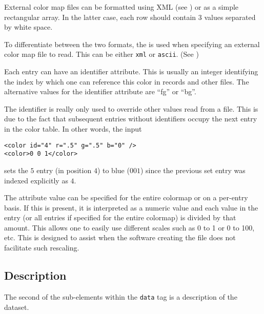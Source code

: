 \documentclass{article}
\def\XMLAttribute#1{\Escape{#1}}
\begin{document}


External color map files can be formatted using XML (see
) or as a simple rectangular array.  In the
latter case, each row should contain 3 values separated by white
space.


To differentiate between the two formats, the \XMLAttribute{type} is
used when specifying an external color map file to read.  This can be
either \texttt{xml} or \texttt{ascii}.  (See )


Each entry can have an identifier attribute.  This is usually an
integer identifying the index by which one can reference this color in
records and other files.  The alternative values for the identifier
attribute are ``fg'' or ``bg''.

The identifier is really only used to override other values read from
a file.  This is due to the fact that subsequent entries without
identifiers occupy the next entry  in the color table.
In other words, the input
\begin{verbatim}
<color id="4" r=".5" g=".5" b="0" />
<color>0 0 1</color>
\end{verbatim}
sets the $5$ entry (in position $4$) to blue ($0 0 1$) since the
previous set entry was indexed explicitly as $4$.


The attribute \XMLAttribute{range} value can be specified for the entire
colormap or on a per-entry basis.  If this is present, it is
interpreted as a numeric value and each value in the entry (or all
entries if specified for the entire colormap) is divided by that
amount.  This allows one to easily use different scales such as 0 to 1
or 0 to 100, etc. This is designed to assist when the software
creating the file does not facilitate such rescaling.

\subsection{Description}

The second of the sub-elements within the \texttt{data} tag is
a description of the dataset.
\end{document}

